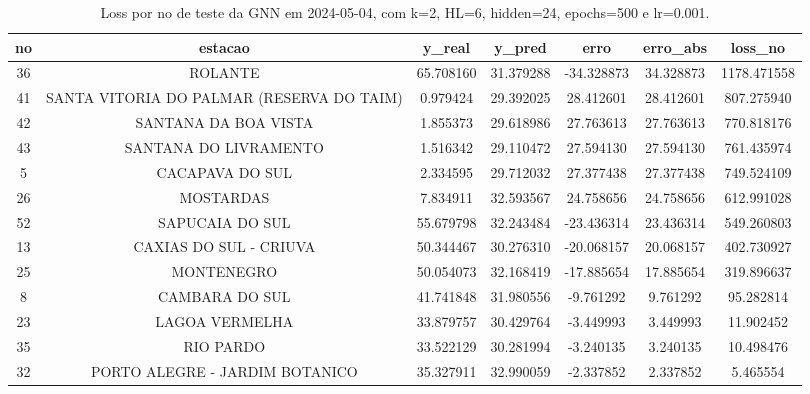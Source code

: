 \begin{table}[h]
\centering
\caption{Loss por no de teste da GNN em 2024-05-04, com k=2, HL=6, hidden=24, epochs=500 e lr=0.001.}
\label{tab:gnn_loss_k2_hl6_h24_e500_d20240504}
\begin{tabular}{ccccccc}
\toprule
no & estacao & y\_real & y\_pred & erro & erro\_abs & loss\_no \\
\midrule
36 & ROLANTE & 65.708160 & 31.379288 & -34.328873 & 34.328873 & 1178.471558 \\
41 & SANTA VITORIA DO PALMAR (RESERVA DO TAIM) & 0.979424 & 29.392025 & 28.412601 & 28.412601 & 807.275940 \\
42 & SANTANA DA BOA VISTA & 1.855373 & 29.618986 & 27.763613 & 27.763613 & 770.818176 \\
43 & SANTANA DO LIVRAMENTO & 1.516342 & 29.110472 & 27.594130 & 27.594130 & 761.435974 \\
5 & CACAPAVA DO SUL & 2.334595 & 29.712032 & 27.377438 & 27.377438 & 749.524109 \\
26 & MOSTARDAS & 7.834911 & 32.593567 & 24.758656 & 24.758656 & 612.991028 \\
52 & SAPUCAIA DO SUL & 55.679798 & 32.243484 & -23.436314 & 23.436314 & 549.260803 \\
13 & CAXIAS DO SUL - CRIUVA & 50.344467 & 30.276310 & -20.068157 & 20.068157 & 402.730927 \\
25 & MONTENEGRO & 50.054073 & 32.168419 & -17.885654 & 17.885654 & 319.896637 \\
8 & CAMBARA DO SUL & 41.741848 & 31.980556 & -9.761292 & 9.761292 & 95.282814 \\
23 & LAGOA VERMELHA & 33.879757 & 30.429764 & -3.449993 & 3.449993 & 11.902452 \\
35 & RIO PARDO & 33.522129 & 30.281994 & -3.240135 & 3.240135 & 10.498476 \\
32 & PORTO ALEGRE - JARDIM BOTANICO & 35.327911 & 32.990059 & -2.337852 & 2.337852 & 5.465554 \\
\bottomrule
\end{tabular}
\end{table}
